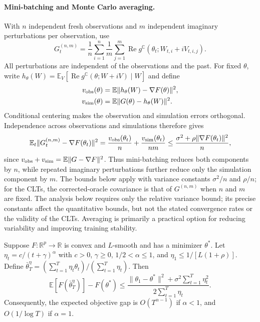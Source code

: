 \paragraph{Mini-batching and Monte Carlo averaging.}
With $n$ independent fresh observations and $m$ independent imaginary
perturbations per observation, use
\[
G_t^{(n,m)}=\frac1n\sum_{i=1}^n\frac1m\sum_{j=1}^m
\operatorname{Re}g^{\mathbb C}(\theta_t;W_{t,i}+iV_{t,i,j}).
\]
All perturbations are independent of the observations and the past.
For fixed $\theta$, write
$h_\theta(W)=\mathbb E_V[\operatorname{Re}g^{\mathbb C}(\theta;W+iV)\mid W]$
and define
\[
\begin{aligned}
v_{\rm obs}(\theta)&=\mathbb E\|h_\theta(W)-\nabla F(\theta)\|^2,\\
v_{\rm sim}(\theta)&=\mathbb E\|G(\theta)-h_\theta(W)\|^2.
\end{aligned}
\]
Conditional centering makes the observation and simulation errors
orthogonal. Independence across observations and simulations therefore gives
\begin{equation}\label{eq:batch_mc_variance}
\mathbb E_t\|G_t^{(n,m)}-\nabla F(\theta_t)\|^2
=\frac{v_{\rm obs}(\theta_t)}n+
\frac{v_{\rm sim}(\theta_t)}{nm}
\le\frac{\sigma^2+\rho\|\nabla F(\theta_t)\|^2}{n},
\end{equation}
since $v_{\rm obs}+v_{\rm sim}=\mathbb E\|G-\nabla F\|^2$.
Thus mini-batching reduces both components by $n$, while repeated imaginary
perturbations further reduce only the simulation component by $m$.
The bounds below apply with variance constants $\sigma^2/n$ and $\rho/n$;
for the CLTs, the corrected-oracle covariance is that of $G^{(n,m)}$
when $n$ and $m$ are fixed.
The analysis below requires only the relative variance bound; its precise
constants affect the quantitative bounds, but not the stated convergence
rates or the validity of the CLTs. Averaging is primarily a practical
option for reducing variability and improving training stability.

\begin{theorem}\label{thm:convex}
Suppose $F:\mathbb R^p\to\mathbb R$ is convex and $L$-smooth and has a
minimizer $\theta^*$. Let $\eta_t=c/(t+\gamma)^\alpha$ with
$c>0$, $\gamma\ge0$, $1/2<\alpha\le1$, and $\eta_1\le1/[L(1+\rho)]$. Define
$\bar\theta_T^{\eta}=(\sum_{t=1}^T\eta_t\theta_t)/
(\sum_{t=1}^T\eta_t)$. Then
\[
\mathbb E[F(\bar\theta_T^{\eta})]-F(\theta^*)
\le
\frac{\|\theta_1-\theta^*\|^2
+\sigma^2\sum_{t=1}^T\eta_t^2}
{2\sum_{t=1}^T\eta_t}.
\]
Consequently, the expected objective gap is $O(T^{\alpha-1})$ if
$\alpha<1$, and $O(1/\log T)$ if $\alpha=1$.
\end{theorem}

